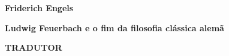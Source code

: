 \textbf{Friderich Engels} \lipsum[1]

\textbf{Ludwig Feuerbach e o fim da filosofia clássica alemã} \lipsum[2]
        
\textbf{TRADUTOR} \lipsum[3]
